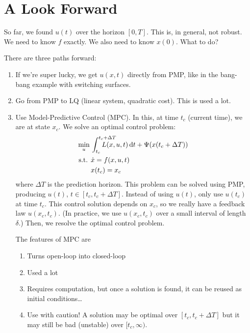 \section{A Look Forward}
So far, we found $u(t)$ over the horizon $[0,T]$. This is, in general, not robust. We need to know $f$ exactly. We also need to know $x(0)$. What to do?

There are three paths forward:
\begin{enumerate}
\item If we're super lucky, we get $u(x,t)$ directly from PMP, like in the bang-bang example with switching surfaces.
\item Go from PMP to LQ (linear system, quadratic cost). This is used a lot.
\item Use Model-Predictive Control (MPC). In this, at time $t_c$ (current time), we are at state $x_c$. We solve an optimal control problem:
  \begin{align}
    \min_u {} & \int_{t_c}^{\mathrlap{t_c+\Delta T}} L(x,u,t)\dif t + \Psi(x(t_c+\Delta T)) \\
    \text{s.t. } & \dot x = f(x,u,t) \\
              & x(t_c) = x_c
  \end{align}
  where $\Delta T$ is the prediction horizon. This problem can be solved using PMP, producing $u(t)$, $t\in[t_c,t_c+\Delta T]$. Instead of using $u(t)$, only use $u(t_c)$ at time $t_c$. This control solution depends on $x_c$, so we really have a feedback law $u(x_c,t_c)$. (In practice, we use $u(x_c,t_c)$ over a small interval of length $\delta$.) Then, we resolve the optimal control problem.

  The features of MPC are
  \begin{enumerate}[nosep]
  \item Turns open-loop into closed-loop
  \item Used a lot
  \item Requires computation, but once a solution is found, it can be reused as initial conditions\dots
  \item Use with caution! A solution may be optimal over $[t_c,t_c+\Delta T]$ but it may still be bad (unstable) over $[t_c,\infty)$.
  \end{enumerate}
\end{enumerate}

